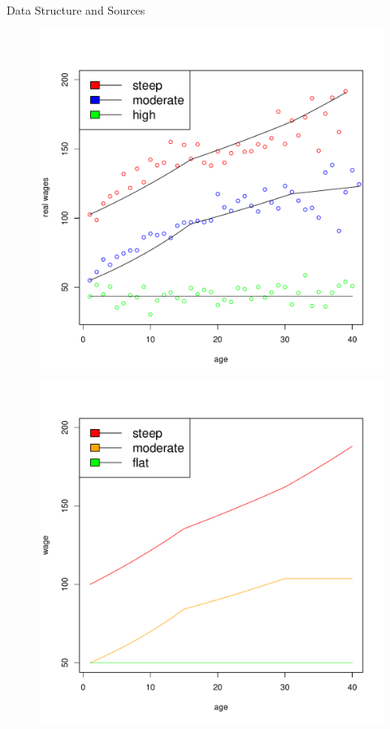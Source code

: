 \documentclass{beamer}
\begin{document}
\begin{frame}[allowframebreaks]{Data Structure and Sources}
\begin{itemize}
\begin{figure}[h]
		\includegraphics[scale=0.25]{figs/heterwage.pdf}
		\includegraphics[scale=0.25]{figs/heterwageless.pdf}
\end{figure}


\end{itemize}
\end{frame}
\end{document}
